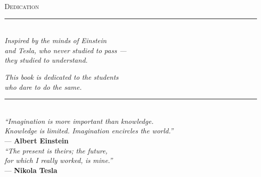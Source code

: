 
\thispagestyle{empty}
\vspace*{\fill}

\begin{center}


\vspace{-6.5cm}

{\large\color{codexgold}\textsc{Dedication}}\\[0.8cm]

\color{codexblue}\rule{0.4\textwidth}{0.5pt}\\[0.8cm]

{\large\itshape\color{codexblue}
Inspired by the minds of Einstein \\[0.3cm]
 and Tesla, who never studied to pass ---\\[0.3cm]
they studied to understand.\\[0.8cm]
}
\vspace{1.2cm}

{\normalsize\itshape\color{darkgray}
This book is dedicated to the students\\[0.2cm]
who dare to do the same.\\[0.8cm]
}

\color{codexblue}\rule{0.4\textwidth}{0.5pt}\\[0.8cm]

{\small\color{darkgray}
\textit{``Imagination is more important than knowledge.\\
Knowledge is limited. Imagination encircles the world.''}\\[0.3cm]
--- \textbf{Albert Einstein}\\[0.6cm]

\textit{``The present is theirs; the future,\\
for which I really worked, is mine.''}\\[0.3cm]
--- \textbf{Nikola Tesla}
}

\vspace{1.2cm}

\end{center}

\vspace*{\fill}

